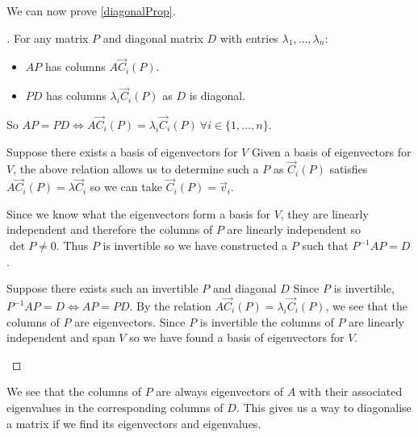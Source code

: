 \documentclass[../main.tex]{subfiles}
\begin{document}
We can now prove \cref{diagonalProp}.
\begin{proof}[]
  For any matrix $P$ and diagonal matrix $D$ with entries $\lambda_1, \ldots, \lambda_n$:
  \begin{itemize}
    \item $AP$ has columns $A\vec{C}_i(P)$.
    \item $PD$ has columns $\lambda_i\vec{C}_i(P)$ as $D$ is diagonal.
  \end{itemize}
  So $AP = PD \iff A \vec{C}_i(P) = \lambda_i \vec{C}_i(P)\ \forall i \in \{1, \ldots, n\}$.

  \begin{proofdirection}{Suppose there exists a basis of eigenvectors for $V$}
    Given a basis of eigenvectors for $V$, the above relation allows us to determine such a $P$ as $\vec{C}_i(P)$ satisfies $A\vec{C}_i(P) = \lambda \vec{C}_i$ so we can take $\vec{C}_i(P) = \vec{v}_i$.

    Since we know what the eigenvectors form a basis for $V$, they are linearly independent and therefore the columns of $P$ are linearly independent so $\det P \neq 0$.
    Thus $P$ is invertible so we have constructed a $P$ such that $P^{-1} A P = D$.
  \end{proofdirection}
  \begin{proofdirection}{Suppose there exists such an invertible $P$ and diagonal $D$}
    Since $P$ is invertible, $P^{-1} A P = D \iff AP = PD$.
    By the relation $A\vec{C}_i(P) = \lambda_i \vec{C}_i(P)$, we see that the columns of $P$ are eigenvectors.
    Since $P$ is invertible the columns of $P$ are linearly independent and span $V$ so we have found a basis of eigenvectors for $V$.
  \end{proofdirection}
\end{proof}
\begin{remark}
  We see that the columns of $P$ are always eigenvectors of $A$ with their associated eigenvalues in the corresponding columns of $D$.
  This gives us a way to diagonalise a matrix if we find its eigenvectors and eigenvalues.
\end{remark}
\end{document}
